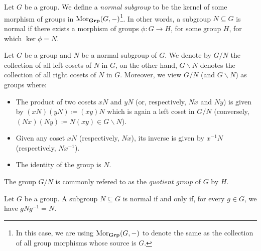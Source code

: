 \begin{definition}
\label{def:normal-subgroup}
Let \(G\) be a group. We define a \emph{normal subgroup} to be the kernel of
some morphism of groups in \(\operatorname{Mor}_{{\textbf{Grp}}}(G, -)\)\footnote{In this case, we are
using \(\operatorname{Mor}_{{\textbf{Grp}}}(G, -)\) to denote the same as the collection of all group
morphisms whose source is \(G\).}. In other words, a subgroup \(N \subseteq G\)
is normal if there exists a morphism of groups \(\phi: G \to H\), for some group
\(H\), for which \(\ker \phi = N\).
\end{definition}

\begin{definition}
\label{def:quotient-group}
Let \(G\) be a group and \(N\) be a normal subgroup of \(G\). We denote by
\(G/N\) the collection of all left cosets of \(N\) in \(G\), on the other hand,
\(G \backslash N\) denotes the collection of all right cosets of \(N\) in
\(G\). Moreover, we view \(G/N\) (and \(G \backslash N\)) as groups where:
\begin{itemize}\setlength\itemsep{0em}
\item The product of two cosets \(x N\) and \(y N\) (or, respectively, \(N
  x\) and \(N y\)) is given by \((x N) (y N) \coloneq (x y) N\) which is again a
  left coset in \(G/N\) (conversely, \((N x) (N y) \coloneq N (x y) \in G
  \backslash N\)).
\item Given any coset \(x N\) (respectively, \(N x\)), its inverse is given by
  \(x^{-1} N\) (respectively, \(N x^{-1}\)).
\item The identity of the group is \(N\).
\end{itemize}
The group \(G/N\) is commonly refered to as the \emph{quotient group} of \(G\)
by \(H\).
\end{definition}

\begin{proposition}
\label{prop:normal-subgroup-equivalence}
Let \(G\) be a group. A subgroup \(N \subseteq G\) is normal if and only if, for
every \(g \in G\), we have \(gNg^{-1} = N\).
\end{proposition}

